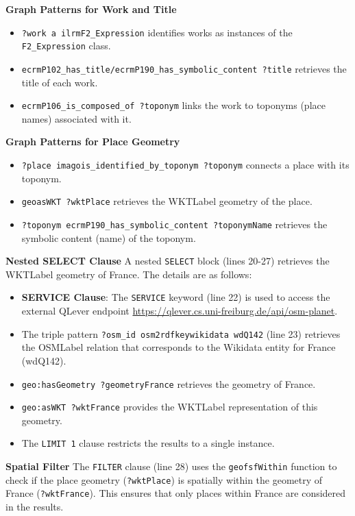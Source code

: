 \textbf{Graph Patterns for Work and Title}
\begin{itemize}
    \item \texttt{?work a \gls{ilrm}F2\_Expression} identifies works as instances of the \\ \texttt{F2\_Expression} class.
    \item \texttt{\gls{ecrm}P102\_has\_title/\gls{ecrm}P190\_has\_symbolic\_content ?title} retrieves the title of each work.
    \item \texttt{\gls{ecrm}P106\_is\_composed\_of ?toponym} links the work to toponyms (place names) associated with it.
\end{itemize}

\textbf{Graph Patterns for Place Geometry}
\begin{itemize}
    \item \texttt{?place \gls{imago}is\_identified\_by\_toponym ?toponym} connects a place with its toponym.
    \item \texttt{\gls{geo}asWKT ?wktPlace} retrieves the \acrshort{WKTLabel} geometry of the place.
    \item \texttt{?toponym \gls{ecrm}P190\_has\_symbolic\_content ?toponymName} retrieves the symbolic content (name) of the toponym.
\end{itemize}

\textbf{Nested SELECT Clause}
A nested \texttt{SELECT} block (lines 20-27) retrieves the \acrshort{WKTLabel} geometry of France. The details are as follows:
\begin{itemize}
    \item \textbf{SERVICE Clause}: The \texttt{SERVICE} keyword (line 22) is used to access the external QLever endpoint \url{https://qlever.cs.uni-freiburg.de/api/osm-planet}.
    \item The triple pattern \texttt{?osm\_id \gls{osm2rdfkey}wikidata \gls{wd}Q142} (line 23) retrieves the \acrshort{OSMLabel} relation that corresponds to the Wikidata entity for France (\gls{wd}Q142).
    \item \texttt{geo:hasGeometry ?geometryFrance} retrieves the geometry of France.
    \item \texttt{geo:asWKT ?wktFrance} provides the \acrshort{WKTLabel} representation of this geometry.
    \item The \texttt{LIMIT 1} clause restricts the results to a single instance.
\end{itemize}

\textbf{Spatial Filter}
The \texttt{FILTER} clause (line 28) uses the \texttt{\gls{geof}sfWithin} function to check if the place geometry (\texttt{?wktPlace}) is spatially within the geometry of France (\texttt{?wktFrance}). This ensures that only places within France are considered in the results.

